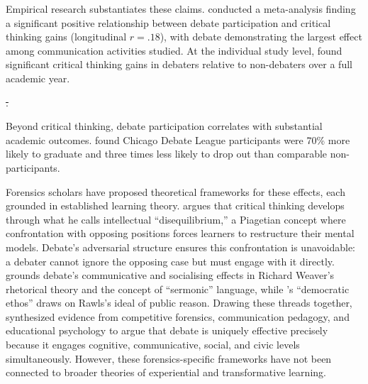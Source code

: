 \documentclass[12pt]{article}
\makeatletter
\providecommand{\DIFdeltex}[1]{{\protect\color{red}\sout{#1}}} %
\providecommand{\DIFdelbegin}{} %
\providecommand{\DIFdelend}{} %
\providecommand{\DIFdel}[1]{\texorpdfstring{\DIFdeltex{#1}}{}} %
\providecommand{\DIFscaledelfig}{0.5}
\newlength{\DIFdelgraphicswidth} %
\newlength{\DIFdelgraphicsheight} %
\providecommand{\DIFdelincludegraphics}[2][]{%
\sbox{\DIFdelgraphicsbox}{\DIFOincludegraphics[#1]{#2}}%
\settoboxwidth{\DIFdelgraphicswidth}{\DIFdelgraphicsbox} %
\settoboxtotalheight{\DIFdelgraphicsheight}{\DIFdelgraphicsbox} %
\scalebox{\DIFscaledelfig}{%
\parbox[b]{\DIFdelgraphicswidth}{\usebox{\DIFdelgraphicsbox}\\[-\baselineskip] \rule{\DIFdelgraphicswidth}{0em}}\llap{\resizebox{\DIFdelgraphicswidth}{\DIFdelgraphicsheight}{%
\setlength{\unitlength}{\DIFdelgraphicswidth}%
\begin{picture}(1,1)%
\thicklines\linethickness{2pt} %
{\color[rgb]{1,0,0}\put(0,0){\framebox(1,1){}}}%
{\color[rgb]{1,0,0}\put(0,0){\line( 1,1){1}}}%
{\color[rgb]{1,0,0}\put(0,1){\line(1,-1){1}}}%
\end{picture}%
}\hspace*{3pt}}} %
} %
\DeclareRobustCommand{\DIFdelbegin}{\DIFOdelbegin \let\includegraphics\DIFdelincludegraphics} %
\DeclareRobustCommand{\DIFdelend}{\DIFOaddend \let\includegraphics\DIFOincludegraphics} %
\let\sout@orig\sout %
\renewcommand{\sout}[1]{\ifmmode\text{\sout@orig{\ensuremath{#1}}}\else\sout@orig{#1}\fi} %
\makeatother
\begin{document}
Empirical research substantiates these claims. \textcite{allen1999meta} conducted a meta-analysis finding a significant positive relationship between debate participation and critical thinking gains (longitudinal $r = .18$), with debate demonstrating the largest effect among communication activities studied. At the individual study level, \textcite{colbert1987effects} found significant critical thinking gains in debaters relative to non-debaters over a full academic year.

\DIFdelbegin \DIFdel{.
}\DIFdelend 

Beyond critical thinking, debate participation correlates with substantial academic outcomes. \textcite{mezuk2009urban} found Chicago Debate League participants were 70\% more likely to graduate and three times less likely to drop out than comparable non-participants.

Forensics scholars have proposed theoretical frameworks for these effects, each grounded in established learning theory. \textcite{colbert1995enhancing} argues that critical thinking develops through what he calls intellectual ``disequilibrium,'' a Piagetian concept where confrontation with opposing positions forces learners to restructure their mental models. Debate's adversarial structure ensures this confrontation is unavoidable: a debater cannot ignore the opposing case but must engage with it directly. \textcite{cirlin1997sociological} grounds debate's communicative and socialising effects in Richard Weaver's rhetorical theory and the concept of ``sermonic'' language, while \textcite{hicks1998public}'s ``democratic ethos'' draws on Rawls's ideal of public reason. Drawing these threads together, \textcite{bellon2000research} synthesized evidence from competitive forensics, communication pedagogy, and educational psychology to argue that debate is uniquely effective precisely because it engages cognitive, communicative, social, and civic levels simultaneously. However, these forensics-specific frameworks have not been connected to broader theories of experiential and transformative learning.

\end{document}
